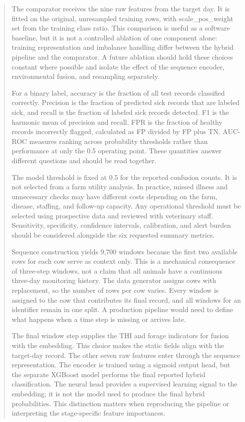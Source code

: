 \documentclass[journal]{IEEEtran}
\begin{document}
\begin{abstract}
The comparator receives the nine raw features from the target day. It is fitted on the original, unresampled training rows, with scale\_pos\_weight set from the training class ratio. This comparison is useful as a software baseline, but it is not a controlled ablation of one component alone: training representation and imbalance handling differ between the hybrid pipeline and the comparator. A future ablation should hold these choices constant where possible and isolate the effect of the sequence encoder, environmental fusion, and resampling separately.

For a binary label, accuracy is the fraction of all test records classified correctly. Precision is the fraction of predicted sick records that are labeled sick, and recall is the fraction of labeled sick records detected. F1 is the harmonic mean of precision and recall. FPR is the fraction of healthy records incorrectly flagged, calculated as FP divided by FP plus TN. AUC-ROC measures ranking across probability thresholds rather than performance at only the 0.5 operating point. These quantities answer different questions and should be read together.

The model threshold is fixed at 0.5 for the reported confusion counts. It is not selected from a farm utility analysis. In practice, missed illness and unnecessary checks may have different costs depending on the farm, disease, staffing, and follow-up capacity. Any operational threshold must be selected using prospective data and reviewed with veterinary staff. Sensitivity, specificity, confidence intervals, calibration, and alert burden should be considered alongside the six requested summary metrics.

Sequence construction yields 9,700 windows because the first two available rows for each cow serve as context only. This is a mechanical consequence of three-step windows, not a claim that all animals have a continuous three-day monitoring history. The data generator assigns cows with replacement, so the number of rows per cow varies. Every window is assigned to the cow that contributes its final record, and all windows for an identifier remain in one split. A production pipeline would need to define what happens when a time step is missing or arrives late.

The final window step supplies the THI and forage indicators for fusion with the embedding. This choice makes the static fields align with the target-day record. The other seven raw features enter through the sequence representation. The encoder is trained using a sigmoid output head, but the separate XGBoost model performs the final reported hybrid classification. The neural head provides a supervised learning signal to the embedding; it is not the model used to produce the final hybrid probabilities. This distinction matters when reproducing the pipeline or interpreting the stage-specific feature importances.


\end{abstract}
\end{document}
